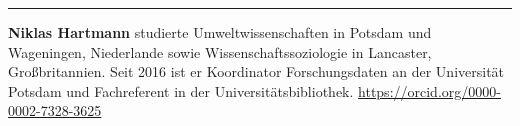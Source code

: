 \begin{center}\rule{0.5\linewidth}{0.5pt}\end{center}

\textbf{Niklas Hartmann} studierte Umweltwissenschaften in Potsdam und
Wageningen, Niederlande sowie Wissenschaftssoziologie in Lancaster,
Großbritannien. Seit 2016 ist er Koordinator Forschungsdaten an der
Universität Potsdam und Fachreferent in der Universitätsbibliothek. \url{https://orcid.org/0000-0002-7328-3625}
